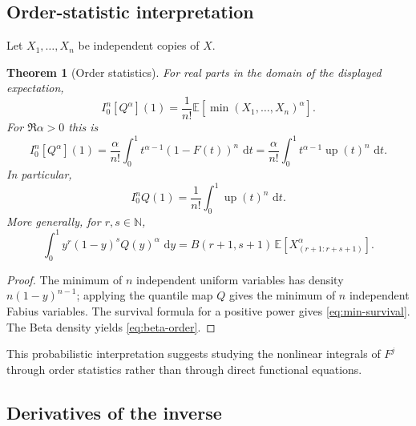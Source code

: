 \documentclass[11pt,oneside]{article}
\numberwithin{equation}{section}
\newtheorem{theorem}{Theorem}[section]
\theoremstyle{definition}
\theoremstyle{remark}
\newcommand{\N}{\mathbb N}
\newcommand{\E}{\mathbb E}
\newcommand{\Up}{\operatorname{up}}
\newcommand{\dd}{\,\mathrm d}
\begin{document}
\subsection{Order-statistic interpretation}

Let $X_1,\ldots,X_n$ be independent copies of $X$.

\begin{theorem}[Order statistics]
\label{thm:order-statistics}
For real parts in the domain of the displayed expectation,
\begin{equation}
 I_0^n[Q^\alpha](1)
 =\frac1{n!}\E\left[\min(X_1,\ldots,X_n)^\alpha\right].       \label{eq:min-order}
\end{equation}
For $\Re\alpha>0$ this is
\begin{equation}
 I_0^n[Q^\alpha](1)
 =\frac{\alpha}{n!}\int_0^1t^{\alpha-1}(1-F(t))^n\,\dd t
 =\frac{\alpha}{n!}\int_0^1t^{\alpha-1}\Up(t)^n\,\dd t.    \label{eq:min-survival}
\end{equation}
In particular,
\begin{equation}
 I_0^nQ(1)=\frac1{n!}\int_0^1\Up(t)^n\,\dd t.                \label{eq:inverse-up-power}
\end{equation}
More generally, for $r,s\in\N$,
\begin{equation}
 \int_0^1y^r(1-y)^sQ(y)^\alpha\,\dd y
 =B(r+1,s+1)\,
 \E\left[X_{(r+1:r+s+1)}^\alpha\right].                     \label{eq:beta-order}
\end{equation}
\end{theorem}

\begin{proof}
The minimum of $n$ independent uniform variables has density
$n(1-y)^{n-1}$; applying the quantile map $Q$ gives the minimum of $n$ independent Fabius
variables.  The survival formula for a positive power gives \eqref{eq:min-survival}.  The
Beta density yields \eqref{eq:beta-order}.
\end{proof}

This probabilistic interpretation suggests studying the nonlinear integrals of $F^j$ through
order statistics rather than through direct functional equations.

\subsection{Derivatives of the inverse}
\end{document}
